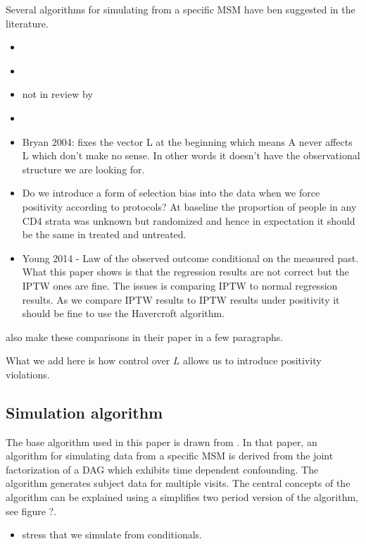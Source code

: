 \documentclass[11pt]{article}
\providecommand{\tightlist}{%
      \setlength{\itemsep}{0pt}\setlength{\parskip}{0pt}}
\begin{document}
Several algorithms for simulating from a specific MSM have ben suggested
in the literature.

\begin{itemize}
\item
  \citet{Havercroft2012}
\item
  \citet{Bryan2004}
\item
  \citet{Westreich2012} not in review by \citet{Havercroft2012}
\item
  \citet{Young2014}
\item
  Bryan 2004: fixes the vector L at the beginning which means A never
  affects L which don't make no sense. In other words it doesn't have
  the observational structure we are looking for.
\item
  Do we introduce a form of selection bias into the data when we force
  positivity according to protocols? At baseline the proportion of
  people in any CD4 strata was unknown but randomized and hence in
  expectation it should be the same in treated and untreated.
\item
  Young 2014 - Law of the observed outcome conditional on the measured
  past. What this paper shows is that the regression results are not
  correct but the IPTW ones are fine. The issues is comparing IPTW to
  normal regression results. As we compare IPTW results to IPTW results
  under positivity it should be fine to use the Havercroft algorithm.
\end{itemize}

\citet{Havercroft2012} also make these comparisons in their paper in a
few paragraphs.

What we add here is how control over \(L\) allows us to introduce
positivity violations.

    \subsection{Simulation algorithm}\label{simulation-algorithm}

The base algorithm used in this paper is drawn from
\citet{Havercroft2012}. In that paper, an algorithm for simulating data
from a specific MSM is derived from the joint factorization of a DAG
which exhibits time dependent confounding. The algorithm generates
subject data for multiple visits. The central concepts of the algorithm
can be explained using a simplifies two period version of the algorithm,
see figure ?. \linebreak

\begin{itemize}
\tightlist
\item
  stress that we simulate from conditionals.
\end{itemize}
\end{document}
